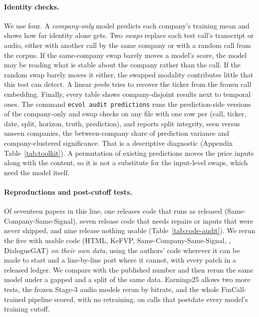 \paragraph{Identity checks.}
\label{sec:controls}
We use four. A \emph{company-only} model predicts each company's training mean
and shows how far identity alone gets. Two \emph{swaps} replace each test call's
transcript or audio, either with another call by the same company or with a
random call from the corpus. If the same-company swap barely moves a model's
score, the model may be reading what is stable about the company rather than
the call. If the random swap barely moves it either, the swapped modality
contributes little that this test can detect. A linear \emph{probe} tries to recover
the ticker from the frozen call embedding. Finally, every table shows
company-disjoint results next to temporal ones. The command \texttt{ecvol audit
predictions} runs the prediction-side versions of the company-only and swap
checks on any file with one row per (call, ticker, date, split, horizon, truth,
prediction), and reports split integrity, seen versus unseen companies, the
between-company share of prediction variance and company-clustered
significance. That is a descriptive diagnostic (Appendix Table~\ref{tab:toolkit}). A permutation of existing predictions moves
the price inputs along with the content, so it is not a substitute for the
input-level swaps, which need the model itself.

\paragraph{Reproductions and post-cutoff tests.}
Of seventeen papers in this line, one releases code that runs as released
(Same-Company-Same-Signal), seven release code that needs repairs or inputs that
were never shipped, and nine release nothing usable (Table~\ref{tab:code-audit}).
We rerun the five with usable code (HTML, KeFVP, Same-Company-Same-Signal,
\citealp{sawhney2020mm}, DialogueGAT) \emph{on their own data}, using the authors'
code wherever it can be made to start and a line-by-line port where it cannot,
with every patch in a released ledger. We compare with the published number and
then rerun the same model under a gapped and a \tickerdisjoint{} split of the same
data. Earnings25 allows two more tests, the frozen Stage-3 audio models rerun by
bitrate, and the whole FinCall-trained pipeline scored, with no retraining, on
calls that postdate every model's training cutoff.
